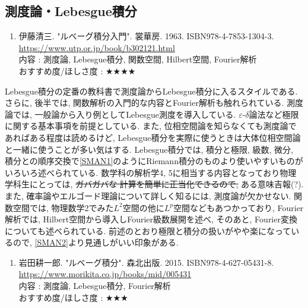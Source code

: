 \documentclass[10pt,a4paper]{jsarticle}
\begin{document}
\subsection{測度論・Lebesgue積分}
    \begin{enumerate}
        \renewcommand{\theenumi}{[ML\arabic{enumi}]}
        \renewcommand{\labelenumi}{\theenumi}
        \setcounter{enumi}{0}
        \item \label{ISML} 伊藤清三. "ルベーグ積分入門". 裳華房. 1963. ISBN978-4-7853-1304-3. \\
        \url{https://www.utp.or.jp/book/b302121.html} \\
        内容 : 測度論, Lebesgue積分, 関数空間, Hilbert空間, Fourier解析\\
        おすすめ度/ほしさ度 : $\bigstar \bigstar \bigstar \bigstar $
    \end{enumerate}\par 
    Lebesgue積分の定番の教科書で測度論からLebesgue積分に入るスタイルである. さらに, 後半では, 関数解析の入門的な内容とFourier解析も触れられている. 測度論では, 一般論から入り例としてLebesgue測度を導入している. $\varepsilon$-$\delta$論法など極限に関する基本事項を前提としている. また, 位相空間論を知らなくても測度論であればある程度は読めるけど, Lebesgue積分を実際に使うときは大体位相空間論と一緒に使うことが多い気はする. Lebesgue積分では, 積分と極限, 級数, 微分, 積分との順序交換で\ref{SMAN1}のようにRiemann積分のものより使いやすいものがいろいろ述べられている. 数学科の解析学4, 5に相当する内容となっており物理学科生にとっては, \sout{ガバガバな 計算を簡単に正当化できるので, }ある意味吉報(?). また, 確率論やエルゴード理論について詳しく知るには, 測度論が欠かせない. 関数空間では, 物理数学2でみた$L^2$空間の他に$L^p$空間などもあつかっており, Fourier解析では, Hilbert空間から導入しFourier級数展開を述べ, そのあと, Fourier変換についても述べられている. 前述のとおり極限と積分の扱いがやや楽になっているので, \ref{SMAN2}より見通しがいい印象がある. 
    \begin{enumerate}
        \renewcommand{\theenumi}{[ML\arabic{enumi}]}
        \renewcommand{\labelenumi}{\theenumi}
        \setcounter{enumi}{1}
        \item \label{IKML} 岩田耕一郎. "ルベーグ積分". 森北出版. 2015. ISBN978-4-627-05431-8. \\
        \url{https://www.morikita.co.jp/books/mid/005431} \\
        内容 : 測度論, Lebesgue積分, Fourier解析\\
        おすすめ度/ほしさ度 : $\bigstar \bigstar \bigstar $
    \end{enumerate}\par 
\end{document}
